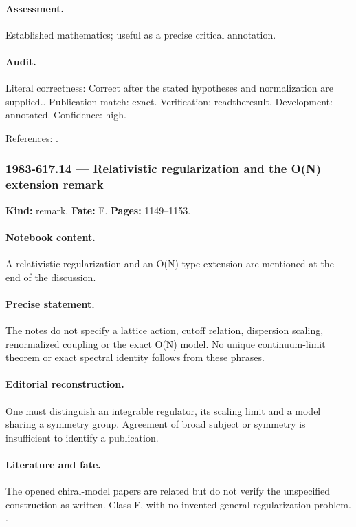 \paragraph{Assessment.} Established mathematics; useful as a precise critical annotation.

\paragraph{Audit.} Literal correctness: Correct after the stated hypotheses and normalization are supplied.. Publication match: exact. Verification: readtheresult. Development: annotated. Confidence: high.

\noindent References: \citep{yang1967manybody,yang1968smatrix}.\par

\subsubsection{1983-617.14 --- Relativistic regularization and the O(N) extension remark}

\label{item:1983-617.14}

\noindent\textbf{Kind:} remark. \textbf{Fate:} F. \textbf{Pages:} 1149--1153.\par

\paragraph{Notebook content.} A relativistic regularization and an O(N)-type extension are mentioned at the end of the discussion.

\paragraph{Precise statement.} The notes do not specify a lattice action, cutoff relation, dispersion scaling, renormalized coupling or the exact O(N) model. No unique continuum-limit theorem or exact spectral identity follows from these phrases.

\paragraph{Editorial reconstruction.} One must distinguish an integrable regulator, its scaling limit and a model sharing a symmetry group. Agreement of broad subject or symmetry is insufficient to identify a publication.

\paragraph{Literature and fate.} The opened chiral-model papers are related but do not verify the unspecified construction as written. Class F, with no invented general regularization problem. \citep{wiegmann1984sun,polyakovwiegmann1983goldstone}.

